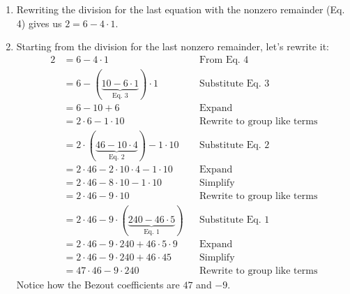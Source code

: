 \documentclass[letterpaper]{article}
\newcommand{\0}{\mathbf{0}}
\begin{document}
\begin{mdframed}
\begin{enumerate}
        \item Rewriting the division for the last equation with the nonzero remainder (Eq. 4) gives us $2 = 6 - 4 \cdot 1.$
        \item Starting from the division for the last nonzero remainder, let's rewrite it: 
        \begin{equation*}
            \begin{aligned}
                2 &= 6 - 4 \cdot 1 && \text{From Eq. 4} \\ 
                    &= 6 - (\underbrace{10 - 6 \cdot 1}_{\text{Eq. 3}}) \cdot 1 && \text{Substitute Eq. 3} \\ 
                    &= 6 - 10 + 6 && \text{Expand} \\ 
                    &= 2 \cdot 6 - 1 \cdot 10 && \text{Rewrite to group like terms} \\ 
                    &= 2 \cdot (\underbrace{46 - 10 \cdot 4}_{\text{Eq. 2}}) - 1 \cdot 10 && \text{Substitute Eq. 2} \\ 
                    &= 2 \cdot 46 - 2 \cdot 10 \cdot 4 - 1 \cdot 10 && \text{Expand} \\ 
                    &= 2 \cdot 46 - 8 \cdot 10 - 1 \cdot 10 && \text{Simplify} \\ 
                    &= 2 \cdot 46 - 9 \cdot 10 && \text{Rewrite to group like terms} \\ 
                    &= 2 \cdot 46 - 9 \cdot (\underbrace{240 - 46 \cdot 5}_{\text{Eq. 1}}) && \text{Substitute Eq. 1} \\ 
                    &= 2 \cdot 46 - 9 \cdot 240 + 46 \cdot 5 \cdot 9 && \text{Expand} \\ 
                    &= 2 \cdot 46 - 9 \cdot 240 + 46 \cdot 45 && \text{Simplify} \\ 
                    &= 47 \cdot 46 - 9 \cdot 240 && \text{Rewrite to group like terms}
            \end{aligned}
        \end{equation*}
        Notice how the Bezout coefficients are $47$ and $-9$. 
    \end{enumerate}
\end{mdframed}
\end{document}
